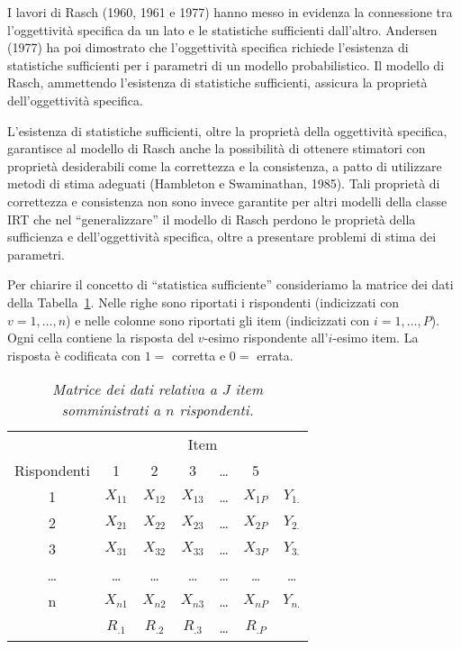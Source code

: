 I lavori di Rasch (1960, 1961 e 1977) hanno messo in evidenza la connessione tra l'oggettività specifica da un lato e le statistiche sufficienti dall'altro. Andersen (1977) ha poi dimostrato che l'oggettività specifica richiede l'esistenza di statistiche sufficienti per i parametri di un modello probabilistico. Il modello di Rasch, ammettendo l'esistenza di statistiche sufficienti, assicura la proprietà dell'oggettività specifica.  

L'esistenza di statistiche sufficienti, oltre la proprietà della oggettività specifica, garantisce al modello di Rasch anche la possibilità di ottenere stimatori con proprietà desiderabili come la correttezza e la consistenza, a patto di utilizzare metodi di stima adeguati (Hambleton e Swaminathan, 1985). Tali proprietà di correttezza e consistenza non sono invece garantite per altri modelli della classe IRT che nel ``generalizzare'' il modello di Rasch perdono le proprietà della sufficienza e dell'oggettività specifica, oltre a presentare problemi di stima dei parametri.

Per chiarire il concetto di ``statistica sufficiente'' consideriamo la matrice dei dati della Tabella~\ref{tab:matr_dati}.  Nelle righe sono riportati i rispondenti (indicizzati con $v = 1, \dots, n$) e nelle colonne sono riportati gli item (indicizzati con $i=1, \dots, P$). Ogni cella contiene la risposta del $v$-esimo rispondente all'$i$-esimo item. La risposta è codificata con $1 =$ corretta e $0 = $ errata.  

\begin{table}
\centering
\begin{tabular}{ccccccc}
\toprule
&\multicolumn{6}{c}{Item} \\
\cmidrule(l){2-7}
Rispondenti &  1  &   2 &   3  &  \dots & 5 \\
\midrule
1     &  $X_{11}$  &  $X_{12}$  &  $X_{13}$  &  \dots  &  $X_{1P}$ & $Y_{1.}$\\
2     &  $X_{21}$  &  $X_{22}$  &  $X_{23}$  &  \dots  &  $X_{2P}$ & $Y_{2.}$\\
3     &  $X_{31}$  &  $X_{32}$  &  $X_{33}$  &  \dots  &  $X_{3P}$ & $Y_{3.}$\\
\dots &  \dots    &  \dots    &  \dots    &  \dots  &  \dots   & \dots \\
n     &  $X_{n1}$  &  $X_{n2}$  &  $X_{n3}$  &  \dots  &  $X_{nP}$ & $Y_{n.}$\\
\midrule
      &  $R_{.1}$  &  $R_{.2}$  &  $R_{.3}$  &  \dots  &  $R_{.P}$ &       \\
\bottomrule
\end{tabular}
\caption{{\it Matrice dei dati relativa a $J$ item somministrati a $n$ rispondenti.} }
\label{tab:matr_dati}
\end{table}

